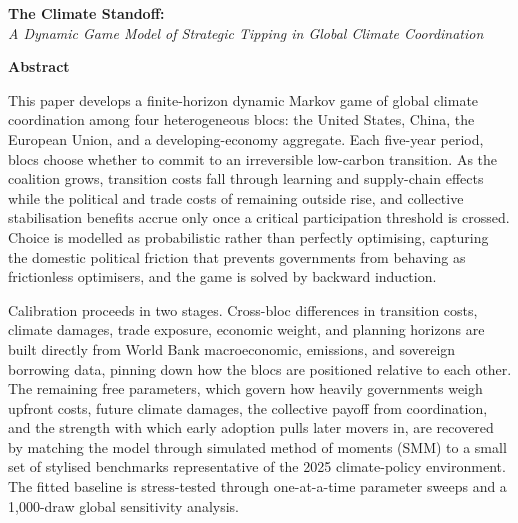 \documentclass[10pt,a4paper]{article}
\begin{document}
\begin{titlepage}
\vspace*{0.4cm}
{\noindent\LARGE\textbf{The Climate Standoff:}\\[0.3em]
\large\textit{A Dynamic Game Model of Strategic Tipping in Global Climate Coordination}
\par}

\vspace{0.8cm}

\textbf{Abstract}

\medskip
This paper develops a finite-horizon dynamic Markov game of global climate coordination among four heterogeneous blocs: the United States, China, the European Union, and a developing-economy aggregate. Each five-year period, blocs choose whether to commit to an irreversible low-carbon transition. As the coalition grows, transition costs fall through learning and supply-chain effects while the political and trade costs of remaining outside rise, and collective stabilisation benefits accrue only once a critical participation threshold is crossed. Choice is modelled as probabilistic rather than perfectly optimising, capturing the domestic political friction that prevents governments from behaving as frictionless optimisers, and the game is solved by backward induction.

Calibration proceeds in two stages. Cross-bloc differences in transition costs, climate damages, trade exposure, economic weight, and planning horizons are built directly from World Bank macroeconomic, emissions, and sovereign borrowing data, pinning down how the blocs are positioned relative to each other. The remaining free parameters, which govern how heavily governments weigh upfront costs, future climate damages, the collective payoff from coordination, and the strength with which early adoption pulls later movers in, are recovered by matching the model through simulated method of moments (SMM) to a small set of stylised benchmarks representative of the 2025 climate-policy environment. The fitted baseline is stress-tested through one-at-a-time parameter sweeps and a 1{,}000-draw global sensitivity analysis.


\end{titlepage}
\end{document}
